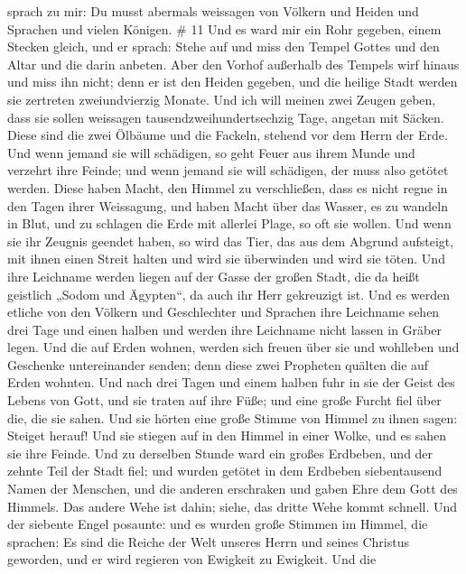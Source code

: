 sprach zu mir: Du musst abermals weissagen von Völkern und Heiden und
Sprachen und vielen Königen. \# 11  Und es ward mir ein Rohr
gegeben, einem Stecken gleich, und er sprach: Stehe auf und miss den
Tempel Gottes und den Altar und die darin anbeten.  Aber den
Vorhof außerhalb des Tempels wirf hinaus und miss ihn nicht; denn er ist
den Heiden gegeben, und die heilige Stadt werden sie zertreten
zweiundvierzig Monate.  Und ich will meinen zwei Zeugen
geben, dass sie sollen weissagen tausendzweihundertsechzig Tage, angetan
mit Säcken.  Diese sind die zwei Ölbäume und die Fackeln,
stehend vor dem Herrn der Erde.  Und wenn jemand sie will
schädigen, so geht Feuer aus ihrem Munde und verzehrt ihre Feinde; und
wenn jemand sie will schädigen, der muss also getötet werden.
 Diese haben Macht, den Himmel zu verschließen, dass es
nicht regne in den Tagen ihrer Weissagung, und haben Macht über das
Wasser, es zu wandeln in Blut, und zu schlagen die Erde mit allerlei
Plage, so oft sie wollen.  Und wenn sie ihr Zeugnis geendet
haben, so wird das Tier, das aus dem Abgrund aufsteigt, mit ihnen einen
Streit halten und wird sie überwinden und wird sie töten. 
Und ihre Leichname werden liegen auf der Gasse der großen Stadt, die da
heißt geistlich „Sodom und Ägypten``, da auch ihr Herr gekreuzigt ist.
 Und es werden etliche von den Völkern und Geschlechter und
Sprachen ihre Leichname sehen drei Tage und einen halben und werden ihre
Leichname nicht lassen in Gräber legen.  Und die auf Erden
wohnen, werden sich freuen über sie und wohlleben und Geschenke
untereinander senden; denn diese zwei Propheten quälten die auf Erden
wohnten.  Und nach drei Tagen und einem halben fuhr in sie
der Geist des Lebens von Gott, und sie traten auf ihre Füße; und eine
große Furcht fiel über die, die sie sahen.  Und sie hörten
eine große Stimme von Himmel zu ihnen sagen: Steiget herauf! Und sie
stiegen auf in den Himmel in einer Wolke, und es sahen sie ihre Feinde.
 Und zu derselben Stunde ward ein großes Erdbeben, und der
zehnte Teil der Stadt fiel; und wurden getötet in dem Erdbeben
siebentausend Namen der Menschen, und die anderen erschraken und gaben
Ehre dem Gott des Himmels.  Das andere Wehe ist dahin;
siehe, das dritte Wehe kommt schnell.  Und der siebente
Engel posaunte: und es wurden große Stimmen im Himmel, die sprachen: Es
sind die Reiche der Welt unseres Herrn und seines Christus geworden, und
er wird regieren von Ewigkeit zu Ewigkeit.  Und die
